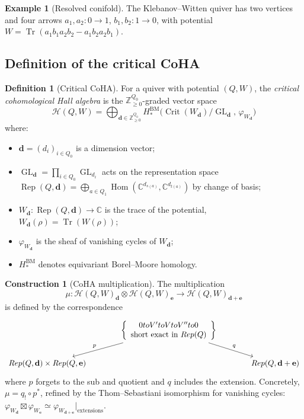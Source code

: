 \documentclass[11pt]{article}
\theoremstyle{definition}
\newtheorem{definition}[theorem]{Definition}
\newtheorem{example}[theorem]{Example}
\newtheorem{construction}[theorem]{Construction}
\theoremstyle{remark}
\newcommand{\ZZ}{\mathbb{Z}}
\newcommand{\CC}{\mathbb{C}}
\newcommand{\Crit}{\operatorname{Crit}}
\newcommand{\Tr}{\operatorname{Tr}}
\newcommand{\Hom}{\operatorname{Hom}}
\newcommand{\CoHA}{\mathcal{H}}
\newcommand{\BM}{\operatorname{BM}}
\newcommand{\GL}{\operatorname{GL}}
\begin{document}
\begin{example}[Resolved conifold]
\label{ex:conifold}
The Klebanov--Witten quiver has two vertices and four arrows
$a_1, a_2 \colon 0 \to 1$, $b_1, b_2 \colon 1 \to 0$, with potential
$W = \Tr(a_1 b_1 a_2 b_2 - a_1 b_2 a_2 b_1)$.
\end{example}


\subsection{Definition of the critical CoHA}
\label{subsec:critical-coha-def}

\begin{definition}[Critical CoHA]
\label{def:critical-coha}
For a quiver with potential $(Q, W)$, the \emph{critical cohomological Hall
algebra} is the $\ZZ_{\geq 0}^{Q_0}$-graded vector space
\[
 \CoHA(Q, W) = \bigoplus_{\mathbf{d} \in \ZZ_{\geq 0}^{Q_0}}
 H^{\BM}_*\bigl(\Crit(W_{\mathbf{d}})/\GL_{\mathbf{d}},\,
 \varphi_{W_{\mathbf{d}}}\bigr)
\]
where:
\begin{itemize}
 \item $\mathbf{d} = (d_i)_{i \in Q_0}$ is a dimension vector;
 \item $\GL_{\mathbf{d}} = \prod_{i \in Q_0} \GL_{d_i}$ acts on the
 representation space $\operatorname{Rep}(Q, \mathbf{d}) = \bigoplus_{a \in Q_1}
 \Hom(\CC^{d_{s(a)}}, \CC^{d_{t(a)}})$ by change of basis;
 \item $W_{\mathbf{d}} \colon \operatorname{Rep}(Q, \mathbf{d}) \to \CC$ is
 the trace of the potential, $W_{\mathbf{d}}(\rho) = \Tr(W(\rho))$;
 \item $\varphi_{W_{\mathbf{d}}}$ is the sheaf of vanishing cycles of $W_{\mathbf{d}}$;
 \item $H^{\BM}_*$ denotes equivariant Borel--Moore homology.
\end{itemize}
\end{definition}

\begin{construction}[CoHA multiplication]
\label{constr:coha-mult}
The multiplication
\[
 \mu \colon \CoHA(Q,W)_{\mathbf{d}} \otimes \CoHA(Q,W)_{\mathbf{e}}
 \longrightarrow \CoHA(Q,W)_{\mathbf{d}+\mathbf{e}}
\]
is defined by the correspondence
\[
\begin{tikzcd}[column sep=large]
 & \left\{\begin{array}{c} 0 \to V' \to V \to V'' \to 0 \\ \text{short exact in } \operatorname{Rep}(Q) \end{array}\right\}
 \arrow[dl, "p"'] \arrow[dr, "q"] & \\
 \operatorname{Rep}(Q, \mathbf{d}) \times \operatorname{Rep}(Q, \mathbf{e})
 & & \operatorname{Rep}(Q, \mathbf{d}+\mathbf{e})
\end{tikzcd}
\]
where $p$ forgets to the sub and quotient and $q$ includes the extension.
Concretely, $\mu = q_! \circ p^*$, refined by the Thom--Sebastiani isomorphism
for vanishing cycles: $\varphi_{W_{\mathbf{d}}} \boxtimes \varphi_{W_{\mathbf{e}}}
\simeq \varphi_{W_{\mathbf{d}+\mathbf{e}}}|_{\text{extensions}}$.
\end{construction}
\end{document}
